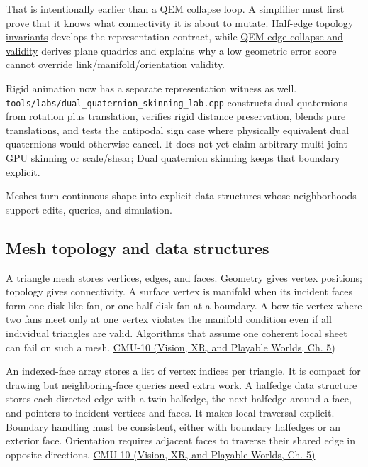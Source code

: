 That is intentionally earlier than a QEM collapse loop. A simplifier must first prove that it knows what connectivity it is about to mutate. \hyperref[appendix-faac749c9cdd]{Half-edge topology invariants} develops the representation contract, while \hyperref[appendix-89db9fe1bc8a]{QEM edge collapse and validity} derives plane quadrics and explains why a low geometric error score cannot override link/manifold/orientation validity.

Rigid animation now has a separate representation witness as well. \texttt{tools/labs/dual\_quaternion\_skinning\_lab.cpp} constructs dual quaternions from rotation plus translation, verifies rigid distance preservation, blends pure translations, and tests the antipodal sign case where physically equivalent dual quaternions would otherwise cancel. It does not yet claim arbitrary multi-joint GPU skinning or scale/shear; \hyperref[appendix-921f3f2efb53]{Dual quaternion skinning} keeps that boundary explicit.

Meshes turn continuous shape into explicit data structures whose neighborhoods support edits, queries, and simulation.

\subsection{Mesh topology and data structures}\label{03-visual-computing-i-ch002-mesh-topology-and-data-structures}

A triangle mesh stores vertices, edges, and faces. Geometry gives vertex positions; topology gives connectivity. A surface vertex is manifold when its incident faces form one disk-like fan, or one half-disk fan at a boundary. A bow-tie vertex where two fans meet only at one vertex violates the manifold condition even if all individual triangles are valid. Algorithms that assume one coherent local sheet can fail on such a mesh. \href{../07-Vision-XR-and-Playable-Worlds/main.pdf\#nameddest=04-visual-computing-ii-ch036-cmu-10---meshes-and-manifolds}{CMU-10 (Vision, XR, and Playable Worlds, Ch. 5)}

An indexed-face array stores a list of vertex indices per triangle. It is compact for drawing but neighboring-face queries need extra work. A halfedge data structure stores each directed edge with a twin halfedge, the next halfedge around a face, and pointers to incident vertices and faces. It makes local traversal explicit. Boundary handling must be consistent, either with boundary halfedges or an exterior face. Orientation requires adjacent faces to traverse their shared edge in opposite directions. \href{../07-Vision-XR-and-Playable-Worlds/main.pdf\#nameddest=04-visual-computing-ii-ch036-cmu-10---meshes-and-manifolds}{CMU-10 (Vision, XR, and Playable Worlds, Ch. 5)}

